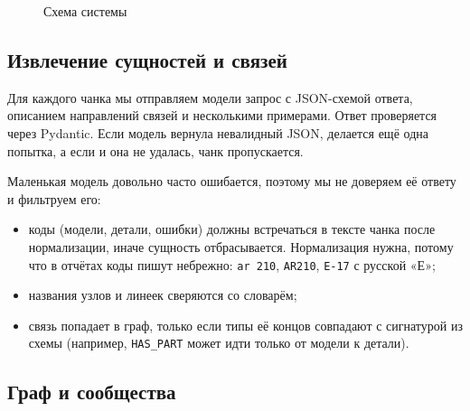 \documentclass[a4paper,12pt]{article}
\newcommand{\code}[1]{\texttt{#1}}
\begin{document}
\begin{figure}[H]
\centering
{}
\caption{Схема системы}
\label{fig:pipeline}
\end{figure}

\subsection{Извлечение сущностей и связей}

Для каждого чанка мы отправляем модели запрос с JSON-схемой ответа, описанием направлений связей и несколькими примерами. Ответ проверяется через Pydantic. Если модель вернула невалидный JSON, делается ещё одна попытка, а если и она не удалась, чанк пропускается.

Маленькая модель довольно часто ошибается, поэтому мы не доверяем её ответу и фильтруем его:
\begin{itemize}
\item коды (модели, детали, ошибки) должны встречаться в тексте чанка после нормализации, иначе сущность отбрасывается. Нормализация нужна, потому что в отчётах коды пишут небрежно: \code{ar 210}, \code{AR210}, \code{Е-17} с русской «Е»;
\item названия узлов и линеек сверяются со словарём;
\item связь попадает в граф, только если типы её концов совпадают с сигнатурой из схемы (например, \code{HAS\_PART} может идти только от модели к детали).
\end{itemize}

\subsection{Граф и сообщества}
\end{document}
